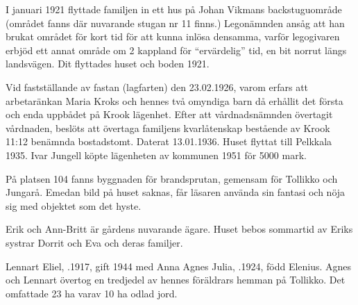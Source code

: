 I januari 1921 flyttade familjen in ett hus på Johan Vikmans backstuguområde (området fanns där nuvarande stugan nr 11 	finns.) Legonämnden ansåg att han brukat området för kort tid för att kunna inlösa densamma, varför legogivaren erbjöd ett annat område om 2 kappland för ``ervärdelig'' tid, en bit norrut längs landsvägen. Dit flyttades huset och boden 1921.

Vid fastställande av fastan (lagfarten) den 23.02.1926, varom erfars att arbetaränkan Maria Kroks och hennes två omyndiga barn då erhållit det första och enda uppbådet på Krook lägenhet. Efter att vårdnadsnämnden övertagit vårdnaden, beslöts att övertaga familjens kvarlåtenskap bestående av Krook 11:12 benämnda bostadstomt. Daterat 13.01.1936. Huset flyttat till Pelkkala 1935. Ivar Jungell köpte lägenheten av kommunen 1951 för 5000 mark.



På platsen 104 fanns byggnaden för brandsprutan, gemensam för Tollikko och Jungarå. Emedan bild på huset saknas, får läsaren använda sin fantasi och nöja sig med objektet som det hyste.\jhvspace{}




Erik och Ann-Britt är gårdens nuvarande ägare. Huset bebos sommartid av Eriks systrar Dorrit och Eva och deras familjer.\jhvspace{}



Lennart Eliel, .1917, gift 1944 med Anna Agnes Julia, .1924, född Elenius. Agnes och Lennart övertog en tredjedel av hennes föräldrars hemman på Tollikko. Det omfattade 23 ha varav 10 ha odlad jord.
\begin{jhchildren}
  \item {}
  \item {}
  \item {}
\end{jhchildren}

